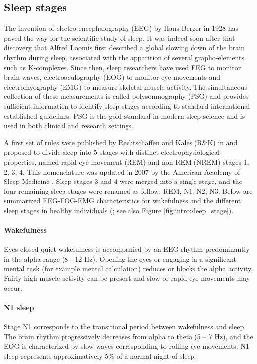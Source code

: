\subsection{Sleep stages}
\label{sec:dream-research:sleep:stages}

The invention of electro-encephalography (EEG) by Hans Berger in 1928 has paved the way for the scientific study of sleep. It was indeed soon after that discovery that Alfred Loomis first described a global slowing down of the brain rhythm during sleep, associated with the apparition of several grapho-elements such as K-complexes. Since then, sleep researchers have used EEG to monitor brain waves, electrooculography (EOG) to monitor eye movements and electromyography (EMG) to measure skeletal muscle activity. The simultaneous collection of these measurements is called polysomnography (PSG) and provides sufficient information to identify sleep stages according to standard international established guidelines. PSG is the gold standard in modern sleep science and is used in both clinical and research settings.

A first set of rules were published by Rechtschaffen and Kales (R\&K) in \citeyear{kales_manual_1968} and proposed to divide sleep into 5 stages with distinct electrophysiological properties, named rapid-eye movement (REM) and non-REM (NREM) stages 1, 2, 3, 4. This nomenclature was updated in 2007 by the American Academy of Sleep Medicine \citep{iber_aasm_2007}. Sleep stages 3 and 4 were merged into a single stage, and the four remaining sleep stages were renamed as follow: REM, N1, N2, N3. Below are summarized EEG-EOG-EMG characteristics for wakefulness and the different sleep stages in healthy individuals  (\citealp{hirshkowitz_normal_2004, iber_aasm_2007}; see also Figure \ref{fig:intro:sleep_stage}).

\paragraph{Wakefulness}
Eyes-closed quiet wakefulness is accompanied by an EEG rhythm predominantly in the alpha range (8 - 12 Hz). Opening the eyes or engaging in a significant mental task (for example mental calculation) reduces or blocks the alpha activity. Fairly high muscle activity can be present and slow or rapid eye movements may occur.

\paragraph{N1 sleep}
Stage N1 corresponds to the transitional period between wakefulness and sleep. The brain rhythm progressively decreases from alpha to theta (5 – 7 Hz), and the EOG is characterized by slow waves corresponding to rolling eye movements. N1 sleep represents approximatively 5\% of a normal night of sleep.

